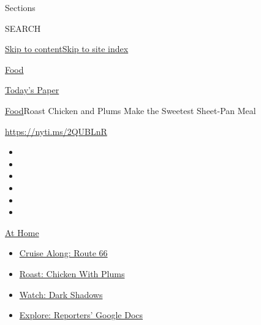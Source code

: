 Sections

SEARCH

\protect\hyperlink{site-content}{Skip to
content}\protect\hyperlink{site-index}{Skip to site index}

\href{https://www.nytimes3xbfgragh.onion/section/food}{Food}

\href{https://myaccount.nytimes3xbfgragh.onion/auth/login?response_type=cookie\&client_id=vi}{}

\href{https://www.nytimes3xbfgragh.onion/section/todayspaper}{Today's
Paper}

\href{/section/food}{Food}\textbar{}Roast Chicken and Plums Make the
Sweetest Sheet-Pan Meal

\url{https://nyti.ms/2QUBLnR}

\begin{itemize}
\item
\item
\item
\item
\item
\item
\end{itemize}

\href{https://www.nytimes3xbfgragh.onion/spotlight/at-home?action=click\&pgtype=Article\&state=default\&region=TOP_BANNER\&context=at_home_menu}{At
Home}

\begin{itemize}
\tightlist
\item
  \href{https://www.nytimes3xbfgragh.onion/2020/09/07/travel/route-66.html?action=click\&pgtype=Article\&state=default\&region=TOP_BANNER\&context=at_home_menu}{Cruise
  Along: Route 66}
\item
  \href{https://www.nytimes3xbfgragh.onion/2020/09/04/dining/sheet-pan-chicken.html?action=click\&pgtype=Article\&state=default\&region=TOP_BANNER\&context=at_home_menu}{Roast:
  Chicken With Plums}
\item
  \href{https://www.nytimes3xbfgragh.onion/2020/09/04/arts/television/dark-shadows-stream.html?action=click\&pgtype=Article\&state=default\&region=TOP_BANNER\&context=at_home_menu}{Watch:
  Dark Shadows}
\item
  \href{https://www.nytimes3xbfgragh.onion/interactive/2020/at-home/even-more-reporters-editors-diaries-lists-recommendations.html?action=click\&pgtype=Article\&state=default\&region=TOP_BANNER\&context=at_home_menu}{Explore:
  Reporters' Google Docs}
\end{itemize}

